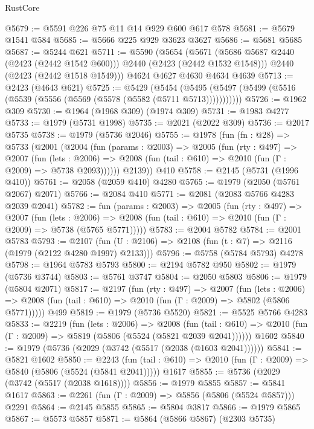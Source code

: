 \begin{lexlean}{RustCore}
\begin{coremodule}
@5679 := @5591 @226 @75 @11 @14 @929 @600 @617 @578
@5681 := @5679 @1541 @584
@5685 := @5666 @225 @929 @3623 @3627
@5686 := @5681 @5685
@5687 := @5244 @621
@5711 := @5590
    (@5654
      (@5671 (@5686 @5687 @2440 (@2423 (@2442 @1542 @600))) @2440 (@2423 (@2442 @1532 @1548)))
      @2440
      (@2423 (@2442 @1518 @1549)))
    @4624
    @4627
    @4630
    @4634
    @4639
@5713 := @2423 (@4643 @621)
@5725 := @5429
    (@5454 (@5495 (@5497 (@5499 (@5516 (@5539 (@5556 (@5569 (@5578 (@5582 (@5711 @5713)))))))))))
@5726 := @1962 @309
@5730 := @1964 (@1968 @309) (@1974 @309)
@5731 := @1983 @4277
@5733 := @1979 (@5731 @1998)
@5735 := @2021 (@2022 @309)
@5736 := @2017 @5735
@5738 := @1979 (@5736 @2046)
@5755 := @1978
    (fun (fn : @28) =>
    @5733
      (@2001
        (@2004
          (fun (params : @2003) =>
          @2005
            (fun (rty : @497) =>
            @2007
              (fun (lets : @2006) =>
              @2008 (fun (tail : @610) => @2010 (fun (Γ : @2009) => @5738 @2093))))))
        @2139))
    @410
@5758 := @2145 (@5731 (@1996 @410))
@5761 := @2058 (@2059 @410) @4280
@5765 := @1979 (@2050 (@5761 @2067) @2071)
@5766 := @2084 @410
@5771 := @2081 (@2083 @5766 @4283 @2039 @2041)
@5782 := fun (params : @2003) =>
  @2005
    (fun (rty : @497) =>
    @2007
      (fun (lets : @2006) =>
      @2008 (fun (tail : @610) => @2010 (fun (Γ : @2009) => @5738 (@5765 @5771)))))
@5783 := @2004 @5782
@5784 := @2001 @5783
@5793 := @2107 (fun (U : @2106) => @2108 (fun (t : @7) => @2116 (@1979 (@2122 @4280 @1997) @2133)))
@5796 := @5758 (@5784 @5793) @4278
@5798 := @1964 @5783 @5793
@5800 := @2194 @5782 @950
@5802 := @1979 (@5736 @3744)
@5803 := @5761 @3747
@5804 := @2050 @5803
@5806 := @1979 (@5804 @2071)
@5817 := @2197
    (fun (rty : @497) =>
    @2007
      (fun (lets : @2006) =>
      @2008 (fun (tail : @610) => @2010 (fun (Γ : @2009) => @5802 (@5806 @5771)))))
    @499
@5819 := @1979 (@5736 @5520)
@5821 := @5525 @5766 @4283
@5833 := @2219
    (fun (lets : @2006) =>
    @2008
      (fun (tail : @610) => @2010 (fun (Γ : @2009) => @5819 (@5806 (@5524 (@5821 @2039 @2041))))))
    @1602
@5840 := @1979 (@5736 (@2029 (@3742 (@5517 (@2038 (@1603 @2041))))))
@5841 := @5821 @1602
@5850 := @2243
    (fun (tail : @610) => @2010 (fun (Γ : @2009) => @5840 (@5806 (@5524 (@5841 @2041)))))
    @1617
@5855 := @5736 (@2029 (@3742 (@5517 (@2038 @1618))))
@5856 := @1979 @5855
@5857 := @5841 @1617
@5863 := @2261 (fun (Γ : @2009) => @5856 (@5806 (@5524 @5857))) @2291
@5864 := @2145 @5855
@5865 := @5804 @3817
@5866 := @1979 @5865
@5867 := @5573 @5857
@5871 := @5864 (@5866 @5867) (@2303 @5735)

\end{coremodule}
\end{lexlean}
